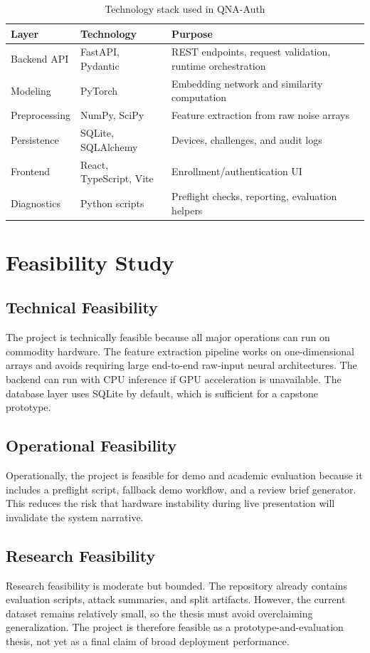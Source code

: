 \documentclass[12pt]{report}
\begin{document}
\begin{table}[H]
\centering
\caption{Technology stack used in QNA-Auth}
\label{tab:stack}
\renewcommand{\arraystretch}{1.3}
\begin{tabular}{p{}p{}p{}}
\toprule
\textbf{Layer} & \textbf{Technology} & \textbf{Purpose} \\
\midrule
Backend API & FastAPI, Pydantic & REST endpoints, request validation, runtime orchestration \\
Modeling & PyTorch & Embedding network and similarity computation \\
Preprocessing & NumPy, SciPy & Feature extraction from raw noise arrays \\
Persistence & SQLite, SQLAlchemy & Devices, challenges, and audit logs \\
Frontend & React, TypeScript, Vite & Enrollment/authentication UI \\
Diagnostics & Python scripts & Preflight checks, reporting, evaluation helpers \\
\bottomrule
\end{tabular}
\end{table}

\section{Feasibility Study}
\subsection{Technical Feasibility}
The project is technically feasible because all major operations can run on commodity hardware. The feature extraction pipeline works on one-dimensional arrays and avoids requiring large end-to-end raw-input neural architectures. The backend can run with CPU inference if GPU acceleration is unavailable. The database layer uses SQLite by default, which is sufficient for a capstone prototype.

\subsection{Operational Feasibility}
Operationally, the project is feasible for demo and academic evaluation because it includes a preflight script, fallback demo workflow, and a review brief generator. This reduces the risk that hardware instability during live presentation will invalidate the system narrative.

\subsection{Research Feasibility}
Research feasibility is moderate but bounded. The repository already contains evaluation scripts, attack summaries, and split artifacts. However, the current dataset remains relatively small, so the thesis must avoid overclaiming generalization. The project is therefore feasible as a prototype-and-evaluation thesis, not yet as a final claim of broad deployment performance.
\end{document}
